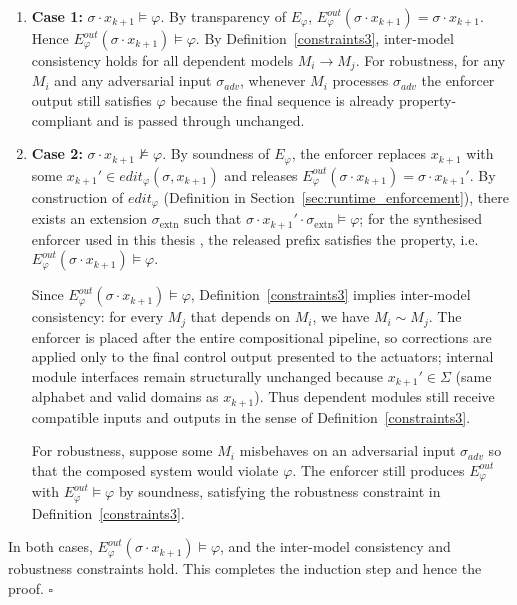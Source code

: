 \begin{enumerate}
    \item \textbf{Case 1:} $\sigma \cdot x_{k+1} \models \varphi$. By transparency of $E_{\varphi}$, $E_{\varphi}^{out}(\sigma \cdot x_{k+1})= \sigma \cdot x_{k+1}$. Hence $E_{\varphi}^{out}(\sigma \cdot x_{k+1}) \models \varphi$. By Definition~\ref{constraints3}, inter-model consistency holds for all dependent models $M_i \rightarrow M_j$. For robustness, for any $M_i$ and any adversarial input $\sigma_{adv}$, whenever $M_i$ processes $\sigma_{adv}$ the enforcer output still satisfies $\varphi$ because the final sequence is already property-compliant and is passed through unchanged.
    
    \item \textbf{Case 2:} $\sigma \cdot x_{k+1} \not\models \varphi$. By soundness of $E_{\varphi}$, the enforcer replaces $x_{k+1}$ with some $x_{k+1}' \in edit_{\varphi}(\sigma, x_{k+1})$ and releases $E_{\varphi}^{out}(\sigma \cdot x_{k+1}) = \sigma \cdot x_{k+1}'$. By construction of $edit_{\varphi}$ (Definition in Section~\ref{sec:runtime_enforcement}), there exists an extension $\sigma_{\text{extn}}$ such that $\sigma \cdot x_{k+1}' \cdot \sigma_{\text{extn}} \models \varphi$; for the synthesised enforcer used in this thesis \cite{10.1145/3126500}, the released prefix satisfies the property, i.e.\ $E_{\varphi}^{out}(\sigma \cdot x_{k+1}) \models \varphi$.

    Since $E_{\varphi}^{out}(\sigma \cdot x_{k+1}) \models \varphi$, Definition~\ref{constraints3} implies inter-model consistency: for every $M_j$ that depends on $M_i$, we have $M_i \sim M_j$. The enforcer is placed after the entire compositional pipeline, so corrections are applied only to the final control output presented to the actuators; internal module interfaces remain structurally unchanged because $x_{k+1}' \in \Sigma$ (same alphabet and valid domains as $x_{k+1}$). Thus dependent modules still receive compatible inputs and outputs in the sense of Definition~\ref{constraints3}.

    For robustness, suppose some $M_i$ misbehaves on an adversarial input $\sigma_{adv}$ so that the composed system would violate $\varphi$. The enforcer still produces $E_{\varphi}^{out}$ with $E_{\varphi}^{out} \models \varphi$ by soundness, satisfying the robustness constraint in Definition~\ref{constraints3}.
\end{enumerate}

In both cases, $E_{\varphi}^{out}(\sigma \cdot x_{k+1}) \models \varphi$, and the inter-model consistency and robustness constraints hold. This completes the induction step and hence the proof. $\square$


